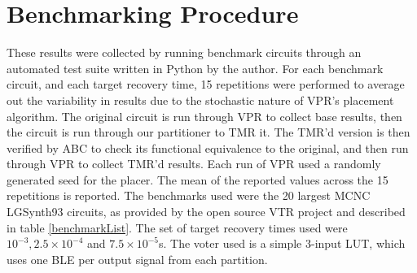 \documentclass[12pt,final,oneside]{dwThesis} %
\begin{document}
   \section{Benchmarking Procedure}
   These results were collected by running benchmark circuits through an automated test suite written in Python by the author. For each benchmark circuit, and each target recovery time, 15 repetitions were performed to average out the variability in results due to the stochastic nature of \gls{VPR}'s placement algorithm.
   The original circuit is run through VPR to collect base results, then the circuit is run through our partitioner to TMR it. The TMR'd version is then verified by \gls{ABC} to check its functional equivalence to the original, and then run through VPR to collect TMR'd results. Each run of VPR used a randomly generated seed for the placer.
   The mean of the reported values across the 15 repetitions is reported.
   The benchmarks used were the 20 largest \gls{MCNC} LGSynth93 circuits, as provided by the open source \gls{VTR} project  and described in table \ref{benchmarkList}.
   The set of target recovery times used were $10^{-3}, 2.5\times10^{-4}$ and $7.5\times10^{-5}$s.
   The voter used is a simple 3-input \gls{LUT}, which uses one \gls{BLE} per output signal from each partition.
\end{document}
